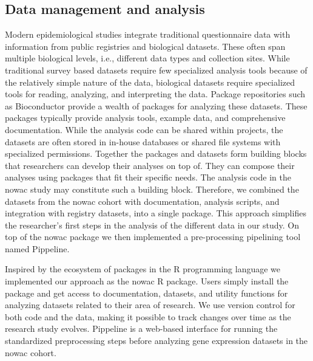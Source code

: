 \subsection{Data management and analysis} 
Modern epidemiological studies integrate traditional questionnaire data with
information from public registries and biological datasets. These often span
multiple biological levels, i.e., different data types and collection sites.
While traditional survey based datasets require few specialized analysis tools
because of the relatively simple nature of the data, biological datasets require
specialized tools for reading, analyzing, and interpreting the data. Package
repositories such as Bioconductor\cite{bioconductor} provide a wealth of
packages for analyzing these datasets. These packages typically provide analysis
tools, example data, and comprehensive documentation. While the analysis code
can be shared within projects, the datasets are often stored in in-house
databases or shared file systems with specialized permissions. Together the
packages and datasets form building blocks that researchers can develop their
analyses on top of. They can compose their analyses using packages that fit
their specific needs. The analysis code in the \gls{nowac} study may constitute
such a building block. Therefore, we combined the datasets from the \gls{nowac}
cohort with documentation, analysis scripts, and integration with registry
datasets, into a single package.  This approach simplifies the researcher's
first steps in the analysis of the different data in our study. On top of the
\gls{nowac} package we then implemented a pre-processing pipelining tool named
Pippeline. 

Inspired by the ecosystem of packages in the R programming language we
implemented our approach as the \gls{nowac} R package. Users simply install the
package and get access to documentation, datasets, and utility functions for
analyzing datasets related to their area of research. We use version
control for both code and the data, making it possible to track changes over
time as the research study evolves. Pippeline is a web-based interface for
running the standardized preprocessing steps before analyzing gene expression
datasets in the \gls{nowac} cohort. 

